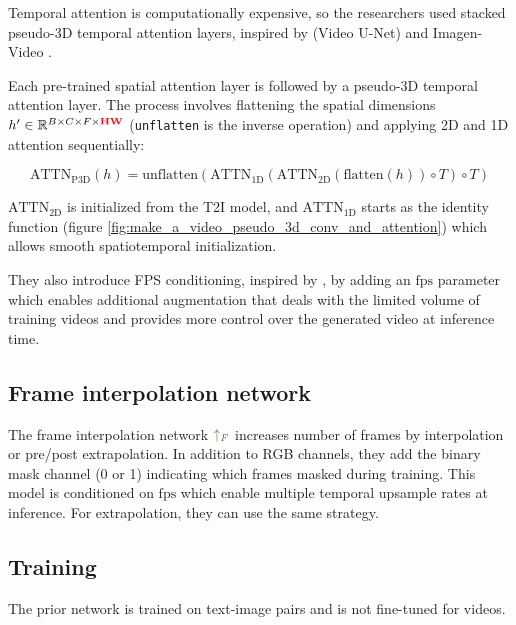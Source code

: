Temporal attention is computationally expensive, so the researchers used stacked pseudo-3D temporal attention layers, inspired by \cite{video_diffusion_models} (Video U-Net) and Imagen-Video \cite{imagen_video}.

Each pre-trained spatial attention layer is followed by a pseudo-3D temporal attention layer. The process involves flattening the spatial dimensions $h' \in \mathbb{R}^{B\times C\times F\times \mathbf{\textcolor{red}{HW}}}$ (\texttt{unflatten} is the inverse operation) and applying 2D and 1D attention sequentially:

\[ \text{ATTN}_{\text{P3D}} (h) = \text{unflatten} 
(\text{ATTN}_{\text{1D}} 
(\text{ATTN}_{\text{2D}} 
(\text{flatten} (h)) \circ T) \circ T) 
\]

$\text{ATTN}_\text{2D}$ is initialized from the T2I model, and $\text{ATTN}_\text{1D}$ starts as the identity function (figure \ref{fig:make_a_video_pseudo_3d_conv_and_attention}) which allows smooth spatiotemporal initialization.

They also introduce FPS conditioning, inspired by \cite{cogvideo}, by adding an $\text{fps}$ parameter which enables additional augmentation that deals with the limited volume of training videos and provides more control over the generated video at inference time.







\subsection{Frame interpolation network}

The frame interpolation network $\textcolor{OliveGreen}{\uparrow_F}$ increases number of frames by interpolation or pre/post extrapolation. In addition to RGB channels, they add the binary mask channel (0 or 1) indicating which frames masked during training. This model is conditioned on $\text{fps}$ which enable multiple temporal upsample rates at inference. For extrapolation, they can use the same strategy.






\subsection{Training}

The prior network is trained on text-image pairs and is not fine-tuned for videos.

